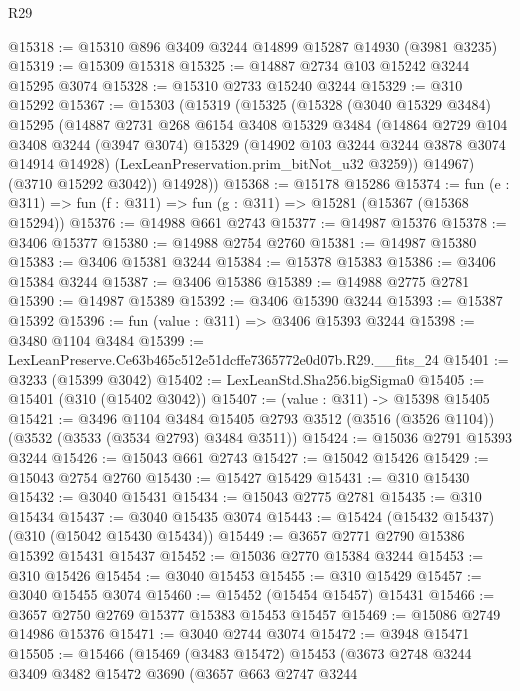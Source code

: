 \begin{lexlean}{R29}
\begin{coremodule}
@15318 := @15310 @896 @3409 @3244 @14899 @15287 @14930 (@3981 @3235)
@15319 := @15309 @15318
@15325 := @14887 @2734 @103 @15242 @3244 @15295 @3074
@15328 := @15310 @2733 @15240 @3244
@15329 := @310 @15292
@15367 := @15303
    (@15319
      (@15325
        (@15328
          (@3040 @15329 @3484)
          @15295
          (@14887
            @2731
            @268
            @6154
            @3408
            @15329
            @3484
            (@14864
              @2729
              @104
              @3408
              @3244
              (@3947 @3074)
              @15329
              (@14902 @103 @3244 @3244 @3878 @3074 @14914 @14928)
              (LexLeanPreservation.prim_bitNot_u32 @3259))
            @14967)
          (@3710 @15292 @3042))
        @14928))
@15368 := @15178 @15286
@15374 := fun (e : @311) => fun (f : @311) => fun (g : @311) => @15281 (@15367 (@15368 @15294))
@15376 := @14988 @661 @2743
@15377 := @14987 @15376
@15378 := @3406 @15377
@15380 := @14988 @2754 @2760
@15381 := @14987 @15380
@15383 := @3406 @15381 @3244
@15384 := @15378 @15383
@15386 := @3406 @15384 @3244
@15387 := @3406 @15386
@15389 := @14988 @2775 @2781
@15390 := @14987 @15389
@15392 := @3406 @15390 @3244
@15393 := @15387 @15392
@15396 := fun (value : @311) => @3406 @15393 @3244
@15398 := @3480 @1104 @3484
@15399 := LexLeanPreserve.Ce63b465c512e51dcffe7365772e0d07b.R29.__fits_24
@15401 := @3233 (@15399 @3042)
@15402 := LexLeanStd.Sha256.bigSigma0
@15405 := @15401 (@310 (@15402 @3042))
@15407 := (value : @311) -> @15398 @15405
@15421 := @3496
    @1104
    @3484
    @15405
    @2793
    @3512
    (@3516 (@3526 @1104))
    (@3532 (@3533 (@3534 @2793) @3484 @3511))
@15424 := @15036 @2791 @15393 @3244
@15426 := @15043 @661 @2743
@15427 := @15042 @15426
@15429 := @15043 @2754 @2760
@15430 := @15427 @15429
@15431 := @310 @15430
@15432 := @3040 @15431
@15434 := @15043 @2775 @2781
@15435 := @310 @15434
@15437 := @3040 @15435 @3074
@15443 := @15424 (@15432 @15437) (@310 (@15042 @15430 @15434))
@15449 := @3657 @2771 @2790 @15386 @15392 @15431 @15437
@15452 := @15036 @2770 @15384 @3244
@15453 := @310 @15426
@15454 := @3040 @15453
@15455 := @310 @15429
@15457 := @3040 @15455 @3074
@15460 := @15452 (@15454 @15457) @15431
@15466 := @3657 @2750 @2769 @15377 @15383 @15453 @15457
@15469 := @15086 @2749 @14986 @15376
@15471 := @3040 @2744 @3074
@15472 := @3948 @15471
@15505 := @15466
    (@15469
      (@3483 @15472)
      @15453
      (@3673
        @2748
        @3244
        @3409
        @3482
        @15472
        @3690
        (@3657
          @663
          @2747
          @3244

\end{coremodule}
\end{lexlean}
